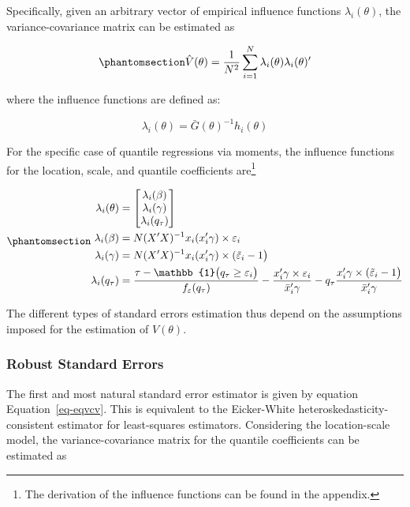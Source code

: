\documentclass[
  12pt,
  oneside]{article}
\begin{document}
Specifically, given an arbitrary vector of empirical influence functions
\(\lambda_i(\theta)\), the variance-covariance matrix can be estimated
as

\begin{equation}\phantomsection\label{eq-eqvcv}{\hat{V}(\theta) = \frac{1}{N^2} \sum_{i=1}^N \lambda_i(\theta) \lambda_i(\theta)'
}\end{equation}

where the influence functions are defined as:

\[\lambda_i(\theta) = \bar G(\theta)^{-1} h_i(\theta)\]

For the specific case of quantile regressions via moments, the influence
functions for the location, scale, and quantile coefficients
are\footnote{The derivation of the influence functions can be found in
  the appendix.}

\begin{equation}\phantomsection\label{eq-ifs}{\begin{aligned}
\lambda_i(\theta)&=
  \begin{bmatrix}
  \lambda_{i}(\beta) \\
  \lambda_{i}(\gamma) \\
  \lambda_{i}(q_\tau) 
  \end{bmatrix} \\
\lambda_{i}(\beta)&=N (X'X)^{-1}  x_i ( x_i'\gamma) \times \varepsilon_i \\
\lambda_{i}(\gamma)&= N(X'X)^{-1} x_i ( x_i' \gamma ) \times (\tilde \varepsilon_i -1\big)\\
\lambda_{i}(q_\tau)&=\frac{\tau-\mathbb{1}\big( q_\tau  \geq \varepsilon_i  \big) }{f_{\varepsilon}(q_\tau)}
- \frac{ x_i'\gamma \times \varepsilon_i }{\bar x_i'\gamma} 
-  q_\tau \frac{  x_i' \gamma  \times (\tilde \varepsilon_i -1\big)}{\bar x_i'\gamma}
\end{aligned}
}\end{equation}

The different types of standard errors estimation thus depend on the
assumptions imposed for the estimation of \(V(\theta)\).

\subsubsection{Robust Standard Errors}\label{robust-standard-errors}

The first and most natural standard error estimator is given by equation
Equation~\ref{eq-eqvcv}. This is equivalent to the Eicker-White
heteroskedasticity-consistent estimator for least-squares estimators.
Considering the location-scale model, the variance-covariance matrix for
the quantile coefficients can be estimated as
\end{document}
